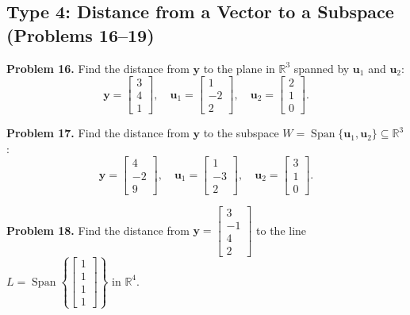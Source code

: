 \documentclass[11pt, letterpaper]{article}
\theoremstyle{definition}
\theoremstyle{remark}
\newcommand{\R}{\mathbb{R}}
\begin{document}
\subsection{Type 4: Distance from a Vector to a Subspace (Problems 16--19)}

\textbf{Problem 16.} Find the distance from $\mathbf{y}$ to the plane in $\R^3$ spanned by $\mathbf{u}_1$ and $\mathbf{u}_2$:
\[
\mathbf{y} = \begin{bmatrix} 3 \\ 4 \\ 1 \end{bmatrix}, \quad \mathbf{u}_1 = \begin{bmatrix} 1 \\ -2 \\ 2 \end{bmatrix}, \quad \mathbf{u}_2 = \begin{bmatrix} 2 \\ 1 \\ 0 \end{bmatrix}.
\]

\textbf{Problem 17.} Find the distance from $\mathbf{y}$ to the subspace $W = \operatorname{Span}\{\mathbf{u}_1, \mathbf{u}_2\} \subseteq \R^3$:
\[
\mathbf{y} = \begin{bmatrix} 4 \\ -2 \\ 9 \end{bmatrix}, \quad \mathbf{u}_1 = \begin{bmatrix} 1 \\ -3 \\ 2 \end{bmatrix}, \quad \mathbf{u}_2 = \begin{bmatrix} 3 \\ 1 \\ 0 \end{bmatrix}.
\]

\textbf{Problem 18.} Find the distance from $\mathbf{y} = \begin{bmatrix} 3 \\ -1 \\ 4 \\ 2 \end{bmatrix}$ to the line $L = \operatorname{Span}\left\{\begin{bmatrix} 1 \\ 1 \\ 1 \\ 1 \end{bmatrix}\right\}$ in $\R^4$.
\end{document}
